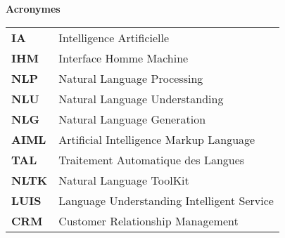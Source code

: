 
\thispagestyle{empty}

\textbf{\LARGE{Acronymes}}

\vspace{2em}

\begin{tabular}{ll}
		\textbf{IA} & Intelligence Artificielle \\
    \textbf{IHM} & Interface Homme Machine \\		
    \textbf{NLP} & Natural Language Processing \\		
		\textbf{NLU} & Natural Language Understanding \\
		\textbf{NLG} & Natural Language Generation \\
		\textbf{AIML } & Artificial Intelligence Markup Language \\
		\textbf{TAL} & Traitement Automatique des Langues \\
		\textbf{NLTK} & Natural Language ToolKit \\
		\textbf{LUIS} & Language Understanding Intelligent Service \\
		\textbf{CRM} & Customer Relationship Management \\
\end{tabular}